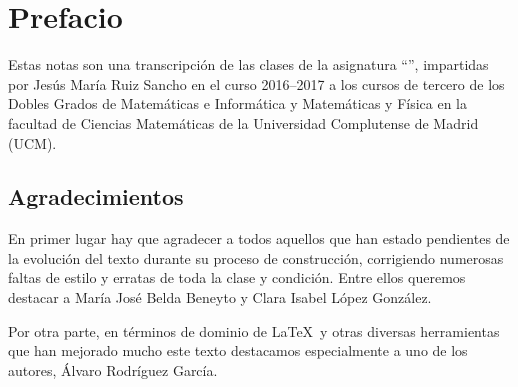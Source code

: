 \section*{Prefacio}
\label{pref}
Estas notas son una transcripción de las clases de la asignatura ``'', impartidas por Jesús María Ruiz Sancho en el curso 2016--2017 a los cursos de tercero de los Dobles Grados de Matemáticas e Informática y Matemáticas y Física en la facultad de Ciencias Matemáticas de la Universidad Complutense de Madrid (UCM).

\subsection*{Agradecimientos}
En primer lugar hay que agradecer a todos aquellos que han estado pendientes de la evolución del texto durante su proceso de construcción, corrigiendo numerosas faltas de estilo y erratas de toda la clase y condición. Entre ellos queremos destacar a María José Belda Beneyto y Clara Isabel López González.

Por otra parte, en términos de dominio de \LaTeX\ y otras diversas herramientas que han mejorado mucho este texto destacamos especialmente a uno de los autores, Álvaro Rodríguez García.